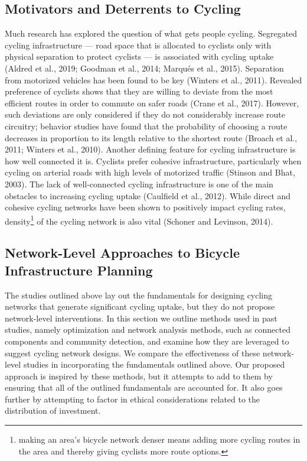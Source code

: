\documentclass[
]{article}
\begin{document}
\hypertarget{motivators-and-deterrents-to-cycling}{%
\subsection{Motivators and Deterrents to Cycling}\label{motivators-and-deterrents-to-cycling}}

Much research has explored the question of what gets people cycling.
Segregated cycling infrastructure --- road space that is allocated to cyclists only with physical separation to protect cyclists --- is associated with cycling uptake (Aldred et al., 2019; Goodman et al., 2014; Marqués et al., 2015).
Separation from motorized vehicles has been found to be key (Winters et al., 2011).
Revealed preference of cyclists shows that they are willing to deviate from the most efficient routes in order to commute on safer roads (Crane et al., 2017).
However, such deviations are only considered if they do not considerably increase route circuitry; behavior studies have found that the probability of choosing a route decreases in proportion to its length relative to the shortest route (Broach et al., 2011; Winters et al., 2010).
Another defining feature for cycling infrastructure is how well connected it is.
Cyclists prefer cohesive infrastructure, particularly when cycling on arterial roads with high levels of motorized traffic (Stinson and Bhat, 2003).
The lack of well-connected cycling infrastructure is one of the main obstacles to increasing cycling uptake (Caulfield et al., 2012).
While direct and cohesive cycling networks have been shown to positively impact cycling rates, density\footnote{making an area's bicycle network denser means adding more cycling routes in the area and thereby giving cyclists more route options.} of the cycling network is also vital (Schoner and Levinson, 2014).

\hypertarget{network-level-approaches-to-bicycle-infrastructure-planning}{%
\subsection{Network-Level Approaches to Bicycle Infrastructure Planning}\label{network-level-approaches-to-bicycle-infrastructure-planning}}

The studies outlined above lay out the fundamentals for designing cycling networks that generate significant cycling uptake, but they do not propose network-level interventions.
In this section we outline methods used in past studies, namely optimization and network analysis methods, such as connected components and community detection, and examine how they are leveraged to suggest cycling network designs.
We compare the effectiveness of these network-level studies in incorporating the fundamentals outlined above.
Our proposed approach is inspired by these methods, but it attempts to add to them by ensuring that all of the outlined fundamentals are accounted for.
It also goes further by attempting to factor in ethical considerations related to the distribution of investment.
\end{document}

